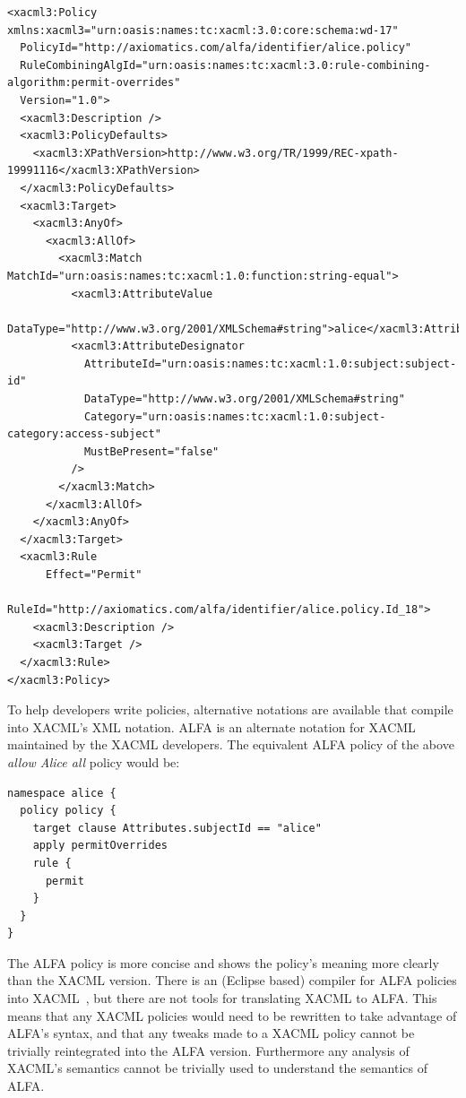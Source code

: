 \documentclass[thesis.tex]{subfiles}
\begin{document}
\begin{lstlisting}
<xacml3:Policy xmlns:xacml3="urn:oasis:names:tc:xacml:3.0:core:schema:wd-17"
  PolicyId="http://axiomatics.com/alfa/identifier/alice.policy"
  RuleCombiningAlgId="urn:oasis:names:tc:xacml:3.0:rule-combining-algorithm:permit-overrides"
  Version="1.0">
  <xacml3:Description />
  <xacml3:PolicyDefaults>
    <xacml3:XPathVersion>http://www.w3.org/TR/1999/REC-xpath-19991116</xacml3:XPathVersion>
  </xacml3:PolicyDefaults>
  <xacml3:Target>
    <xacml3:AnyOf>
      <xacml3:AllOf>
        <xacml3:Match MatchId="urn:oasis:names:tc:xacml:1.0:function:string-equal">
          <xacml3:AttributeValue
            DataType="http://www.w3.org/2001/XMLSchema#string">alice</xacml3:AttributeValue>
          <xacml3:AttributeDesignator 
            AttributeId="urn:oasis:names:tc:xacml:1.0:subject:subject-id"
            DataType="http://www.w3.org/2001/XMLSchema#string"
            Category="urn:oasis:names:tc:xacml:1.0:subject-category:access-subject"
            MustBePresent="false"
          />
        </xacml3:Match>
      </xacml3:AllOf>
    </xacml3:AnyOf>
  </xacml3:Target>
  <xacml3:Rule 
      Effect="Permit"
      RuleId="http://axiomatics.com/alfa/identifier/alice.policy.Id_18">
    <xacml3:Description />
    <xacml3:Target />
  </xacml3:Rule>
</xacml3:Policy>
\end{lstlisting}

To help developers write policies, alternative notations are available that
compile into XACML's XML notation. ALFA is an alternate notation for
XACML~\cite{oasis_xacml_technical_comitee_abbreviated_2015} maintained by the
XACML developers. The equivalent ALFA policy of the above \emph{allow Alice all}
policy would be:

\begin{lstlisting}
namespace alice {
  policy policy {
    target clause Attributes.subjectId == "alice"
    apply permitOverrides
    rule {
      permit
    }
  }
}
\end{lstlisting}

The ALFA policy is more concise and shows the
policy's meaning more clearly than the XACML version.
There is an (Eclipse based) compiler for ALFA policies into
XACML~\cite{axiomaics_axiomatics_2012}, but there are not tools for
translating XACML to ALFA.  This means that any XACML policies would
need to be rewritten to take advantage of ALFA's syntax, and that any
tweaks made to a XACML policy cannot be trivially reintegrated into
the ALFA version.  Furthermore any analysis of XACML's semantics cannot
be trivially used to understand the semantics of ALFA.
\end{document}
